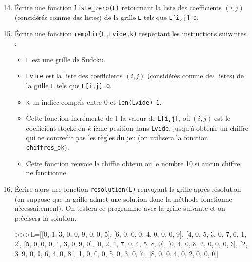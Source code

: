 \documentclass[a4paper,french,11pt,twoside]{VcCours}
\begin{document}
\begin{enumerate}\setcounter{enumi}{13}
\item Écrire une fonction {\tt liste\_zero(L)} retournant la liste des coefficients $(i,j)$ (considérés comme des listes) de la grille {\tt L} tels que {\tt L[i,j]=0}. 
\item Écrire une fonction {\tt remplir(L,Lvide,k)} respectant les instructions suivantes :
\begin{itemize}
\item {\tt L} est une grille de Sudoku.
\item {\tt Lvide} est la liste des coefficients $(i,j)$ (considérés comme des listes) de la grille {\tt L} tels que {\tt L[i,j]=0}.
\item {\tt k} un indice compris entre $0$ et {\tt len(Lvide)-1}.
\item Cette fonction incrémente de $1$ la valeur de {\tt L[i,j]}, où $(i,j)$ est le coefficient stocké en $k$-ième position dans {\tt Lvide}, jusqu'à obtenir un chiffre qui ne contredit pas les règles du jeu (on utilisera la fonction {\tt chiffres\_ok}).
\item  Cette fonction renvoie le chiffre obtenu ou le nombre 10 si aucun chiffre ne fonctionne.
\end{itemize}
\item %
Écrire alors une fonction {\tt resolution(L)} renvoyant la grille après résolution (on suppose que la grille admet une solution donc la méthode fonctionne nécessairement). On testera ce programme avec la grille suivante et on précisera  la solution.
\begin{Python*}
>>>L=[[0, 1, 3, 0, 0, 9, 0, 0, 5],
      [6, 0, 0, 0, 4, 0, 0, 0, 9],
      [4, 0, 5, 3, 0, 7, 6, 1, 2],
      [5, 0, 0, 0, 1, 3, 0, 9, 0], 
      [0, 2, 1, 7, 0, 4, 5, 8, 0], 
      [0, 4, 0, 8, 2, 0, 0, 0, 3], 
      [2, 3, 9, 0, 0, 6, 4, 0, 8], 
      [1, 0, 0, 0, 5, 0, 3, 0, 7],
      [8, 0, 0, 4, 0, 2, 0, 0, 0]]
\end{Python*}
\end{enumerate}
\end{document}
